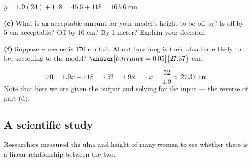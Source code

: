 \documentclass[12pt]{ximera}
\begin{document}
\begin{problem}
\begin{prompt}
\begin{solution}
$y = 1.9(24) + 118 = 45.6 + 118 = 163.6$ cm.
\end{solution}
\end{prompt}

\begin{prompt}
\textbf{(e)} What is an acceptable amount for your model's height to be off by? Is
off by 5 cm acceptable? Off by 10 cm? By 1 meter? Explain your decision.
\begin{freeResponse}
\end{freeResponse}
\end{prompt}

\begin{prompt}
\textbf{(f)} Suppose someone is 170 cm tall. About how long is their ulna bone likely
to be, according to the model?
$\answer[tolerance=0.05]{27.37}$ cm.

\begin{solution}
\[
170 = 1.9x + 118 \implies 52 = 1.9x \implies x = \frac{52}{1.9} \approx 27.37 \text{ cm}.
\]
Note that here we are given the output and solving for the input --- the reverse of
part (d).
\end{solution}
\end{prompt}
\end{problem}

\subsection*{A scientific study}

Researchers measured the ulna and height of many women to see whether there is a
linear relationship between the two.

\end{document}
